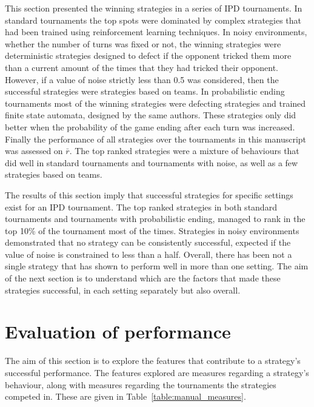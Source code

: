 \documentclass{article}
\newcommand{\numberofalltournaments}{}
\newcommand{\numberofstrategies}{}
\begin{document}
This section presented the winning strategies in a series of IPD tournaments. In
standard tournaments the top spots were dominated by complex strategies that had
been trained using reinforcement learning techniques. In noisy environments,
whether the number of turns was fixed or not, the winning strategies were
deterministic strategies designed to defect if the opponent tricked them more
than a current amount of the times that they had tricked their opponent. However,
if a value of noise strictly less than 0.5 was considered, then the successful
strategies were strategies based on teams. In
probabilistic ending tournaments most of the winning strategies were defecting
strategies and trained finite state automata, designed by the same authors.
These strategies only did better when the probability of the game ending after
each turn was increased.
Finally the performance of all \numberofstrategies
strategies over the \numberofalltournaments tournaments in this manuscript was
assessed on \(\bar{r}\). The top ranked strategies were a mixture of behaviours
that did well in standard tournaments and tournaments with noise, as well as a
few strategies based on teams.

The results of this section imply that successful strategies for specific
settings exist for an IPD tournament. The top ranked strategies in both standard
tournaments and tournaments with probabilistic ending, managed to rank in the
top 10\% of the tournament most of the times.
Strategies in noisy
environments demonstrated that no strategy can be consistently
successful, expected if the value of noise is constrained to less than a half.
Overall, there has been not a single strategy that has shown to perform well in
more than one setting. The aim of the next section is to understand which are
the factors that made these strategies successful, in each setting separately
but also overall.

\section{Evaluation of performance}\label{section:evaluation_of_performance}

The aim of this section is to explore the features that contribute to a
strategy's successful performance. The features explored are measures regarding a
strategy's behaviour, along with measures regarding the tournaments the
strategies competed in. These are given in Table~\ref{table:manual_measures}.
\end{document}
